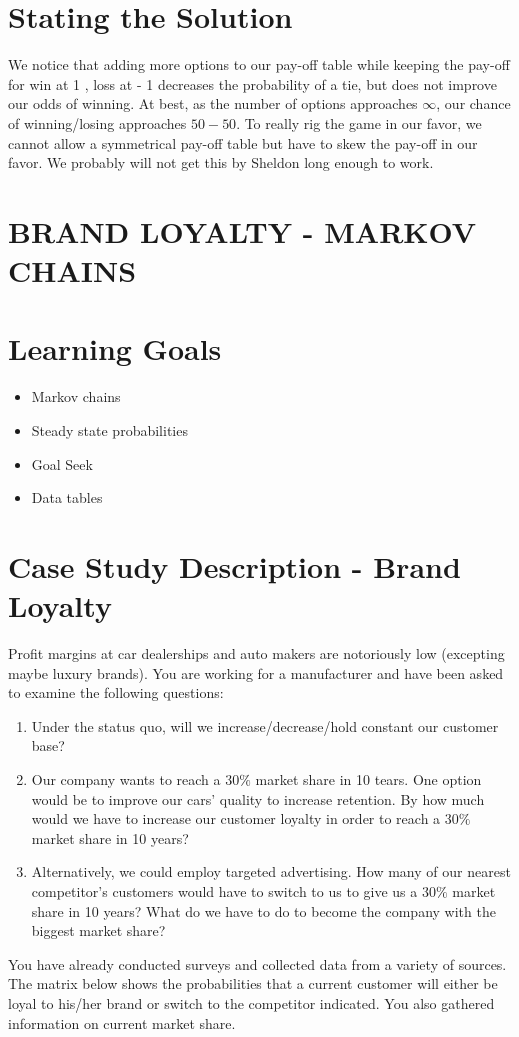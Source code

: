 \documentclass[10pt]{article}
\begin{document}
\section{Stating the Solution}
We notice that adding more options to our pay-off table while keeping the pay-off for win at 1 , loss at - 1 decreases the probability of a tie, but does not improve our odds of winning. At best, as the number of options approaches $\infty$, our chance of winning/losing approaches $50-50$. To really rig the game in our favor, we cannot allow a symmetrical pay-off table but have to skew the pay-off in our favor. We probably will not get this by Sheldon long enough to work.

\section{BRAND LOYALTY - MARKOV CHAINS}
\section{Learning Goals}
\begin{itemize}
  \item Markov chains

  \item Steady state probabilities

  \item Goal Seek

  \item Data tables

\end{itemize}
\section{Case Study Description - Brand Loyalty}
Profit margins at car dealerships and auto makers are notoriously low (excepting maybe luxury brands). You are working for a manufacturer and have been asked to examine the following questions:

\begin{enumerate}
  \item Under the status quo, will we increase/decrease/hold constant our customer base?

  \item Our company wants to reach a $30 \%$ market share in 10 tears. One option would be to improve our cars' quality to increase retention. By how much would we have to increase our customer loyalty in order to reach a $30 \%$ market share in 10 years?

  \item Alternatively, we could employ targeted advertising. How many of our nearest competitor's customers would have to switch to us to give us a $30 \%$ market share in 10 years? What do we have to do to become the company with the biggest market share?

\end{enumerate}
You have already conducted surveys and collected data from a variety of sources. The matrix below shows the probabilities that a current customer will either be loyal to his/her brand or switch to the competitor indicated. You also gathered information on current market share.
\end{document}

